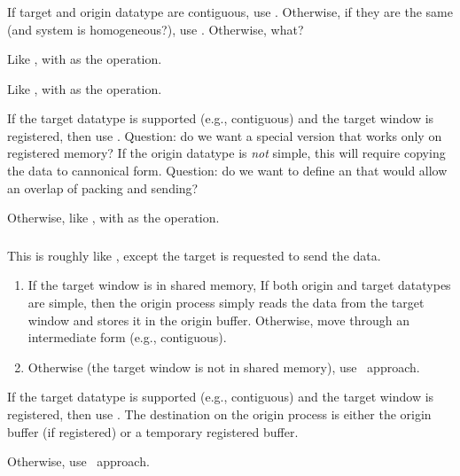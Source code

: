 \documentclass{article}
\begin{document}
\subsubsection{}
\begin{adi3}
\begin{mmadi}If target and origin datatype are contiguous, use
  .  Otherwise, if they are the same (and system is
  homogeneous?), use .  
  Otherwise, what?

\begin{tcp}
Like , with  as the operation.  
\end{tcp}

\begin{shmem}
Like , with  as the operation.  
\end{shmem}

\begin{via}
If the target datatype is supported (e.g., contiguous) and the target window
is registered, then use .  Question: do we want a
special version that works only on registered memory?  If the origin datatype
is \emph{not} simple, this will require copying the data to cannonical form.
Question: do we want to define an  that would
allow an overlap of packing and sending?

Otherwise, like , with  as the
operation.  
\end{via}

\end{mmadi}
\end{adi3}

\subsubsection{}
\begin{tcp}
This is roughly like , except the target is requested to send
the data.  
\end{tcp}
\begin{shmem}
\begin{enumerate}
\item If the target window is in shared memory, 
If both origin and target datatypes are simple, then the origin process simply
reads the data from the target window and stores it in the origin buffer.
Otherwise, move through an intermediate form (e.g., contiguous).  

\item Otherwise (the target window is not in shared memory), 
use \tcpname\ approach.
\end{enumerate}
\end{shmem}
\begin{via}
If the target datatype is supported (e.g., contiguous) and the target window
is registered, then use .  The destination on the origin
process is either the origin buffer (if registered) or a temporary registered
buffer.  

Otherwise, use \tcpname\ approach.
\end{via}
\end{document}
